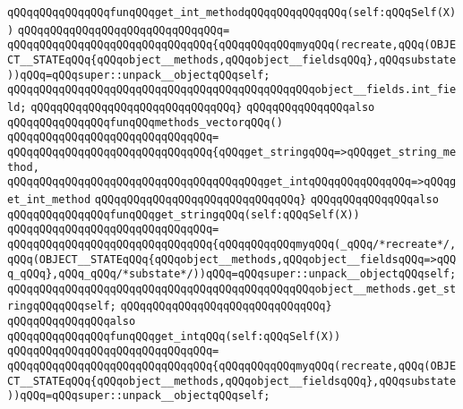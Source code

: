 \verb|qQQqqQQqqQQqqQQqfunqQQqget_int_methodqQQqqQQqqQQqqQQq(self:qQQqSelf(X))|\newline
\verb|qQQqqQQqqQQqqQQqqQQqqQQqqQQqqQQq=|\newline
\verb|qQQqqQQqqQQqqQQqqQQqqQQqqQQqqQQq{qQQqqQQqqQQqmyqQQq(recreate,qQQq(OBJECT__STATEqQQq{qQQqobject__methods,qQQqobject__fieldsqQQq},qQQqsubstate))qQQq=qQQqsuper::unpack__objectqQQqself;|\newline
\verb|qQQqqQQqqQQqqQQqqQQqqQQqqQQqqQQqqQQqqQQqqQQqqQQqobject__fields.int_field;|\newline
\verb|qQQqqQQqqQQqqQQqqQQqqQQqqQQqqQQq}|\newline
\newline
\verb|qQQqqQQqqQQqqQQqalso|\newline
\verb|qQQqqQQqqQQqqQQqfunqQQqmethods_vectorqQQq()|\newline
\verb|qQQqqQQqqQQqqQQqqQQqqQQqqQQqqQQq=|\newline
\verb|qQQqqQQqqQQqqQQqqQQqqQQqqQQqqQQq{qQQqget_stringqQQq=>qQQqget_string_method,|\newline
\verb|qQQqqQQqqQQqqQQqqQQqqQQqqQQqqQQqqQQqqQQqget_intqQQqqQQqqQQqqQQq=>qQQqget_int_method|\newline
\verb|qQQqqQQqqQQqqQQqqQQqqQQqqQQqqQQq}|\newline
\newline
\verb|qQQqqQQqqQQqqQQqalso|\newline
\verb|qQQqqQQqqQQqqQQqfunqQQqget_stringqQQq(self:qQQqSelf(X))|\newline
\verb|qQQqqQQqqQQqqQQqqQQqqQQqqQQqqQQq=|\newline
\verb|qQQqqQQqqQQqqQQqqQQqqQQqqQQqqQQq{qQQqqQQqqQQqmyqQQq(_qQQq/*recreate*/,qQQq(OBJECT__STATEqQQq{qQQqobject__methods,qQQqobject__fieldsqQQq=>qQQq_qQQq},qQQq_qQQq/*substate*/))qQQq=qQQqsuper::unpack__objectqQQqself;|\newline
\verb|qQQqqQQqqQQqqQQqqQQqqQQqqQQqqQQqqQQqqQQqqQQqqQQqobject__methods.get_stringqQQqqQQqself;|\newline
\verb|qQQqqQQqqQQqqQQqqQQqqQQqqQQqqQQq}|\newline
\newline
\verb|qQQqqQQqqQQqqQQqalso|\newline
\verb|qQQqqQQqqQQqqQQqfunqQQqget_intqQQq(self:qQQqSelf(X))|\newline
\verb|qQQqqQQqqQQqqQQqqQQqqQQqqQQqqQQq=|\newline
\verb|qQQqqQQqqQQqqQQqqQQqqQQqqQQqqQQq{qQQqqQQqqQQqmyqQQq(recreate,qQQq(OBJECT__STATEqQQq{qQQqobject__methods,qQQqobject__fieldsqQQq},qQQqsubstate))qQQq=qQQqsuper::unpack__objectqQQqself;|\newline
